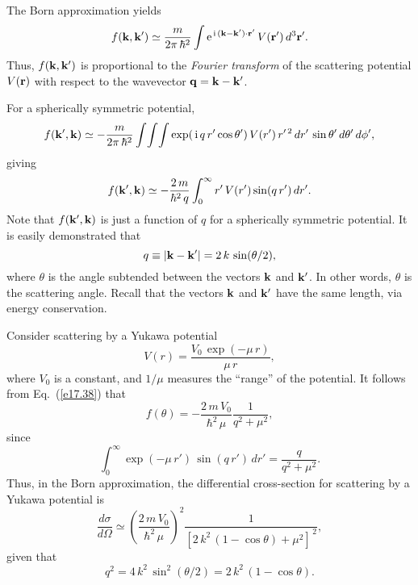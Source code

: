 The Born approximation yields
\begin{equation}
f({\bf k},{\bf k}') \simeq \frac{m}{2\pi\,\hbar^2}
\int {\rm e}^{\,{\rm i}\,({\bf k}-{\bf k'})\cdot{\bf r}'}\,V({\bf r'})\,d^3{\bf r}'.
\end{equation}
Thus, $f({\bf k},{\bf k}')$ is proportional to the {\em Fourier transform}\/ of the scattering potential $V({\bf r})$ with respect to the wavevector 
${\bf q} = {\bf k}-{\bf k}'$.

For a spherically symmetric potential, 
\begin{equation}
f({\bf k}', {\bf k}) \simeq  - \frac{m}{2\pi\, \hbar^2} \int\!\int\!\int
\exp(\,{\rm i} \, q \,r'\cos\theta') \, V(r')\,r'^{\,2}\, dr'\,\sin\theta'
 \,d\theta'\,d\phi',
\end{equation}
giving
\begin{equation}\label{e17.38}
f({\bf k}', {\bf k}) \simeq  - \frac{2\,m}{\hbar^2\,q}
\int_0^\infty r' \,V(r') \sin(q \,r') \,dr'.
\end{equation}
Note that $f({\bf k}', {\bf k})$ is just a function of $q$ for a
spherically symmetric potential.
It is easily demonstrated that
\begin{equation}\label{e17.39}
q \equiv |{\bf k} - {\bf k}'| = 2\, k \,\sin (\theta/2),
\end{equation}
where $\theta$ is the angle subtended between the vectors
${\bf k}$ and ${\bf k}'$. In other words, $\theta$ is the scattering angle. Recall that the
vectors ${\bf k}$ and ${\bf k}'$ have the same length, via energy conservation.

Consider scattering by a Yukawa potential
\begin{equation}
V(r) = \frac{V_0\,\exp(-\mu \,r)}{\mu \,r},
\end{equation}
where $V_0$ is a constant, and $1/\mu$ measures the ``range'' of the
potential. It follows from Eq.~(\ref{e17.38}) that
\begin{equation}
f(\theta) = - \frac{2\,m \,V_0}{\hbar^2\,\mu} \frac{1}{q^2 + \mu^2},
\end{equation}
since
\begin{equation}
\int_0^\infty \exp(-\mu \,r') \,\sin(q\,r') \, dr' = \frac{q}{q^2+ \mu^2}.
\end{equation}
Thus, in the Born approximation, the differential cross-section
for scattering by a Yukawa potential is
\begin{equation}
\frac{d\sigma}{d \Omega} \simeq \left(\frac{2\,m \,V_0}{ \hbar^2\,\mu}\right)^2
\frac{1}{[2\,k^2\, (1-\cos\theta) + \mu^2]^{\,2}},
\end{equation}
given that
\begin{equation}
q^2 = 4\,k^2\, \sin^2(\theta/2) = 2\,k^2\, (1-\cos\theta).
\end{equation}

